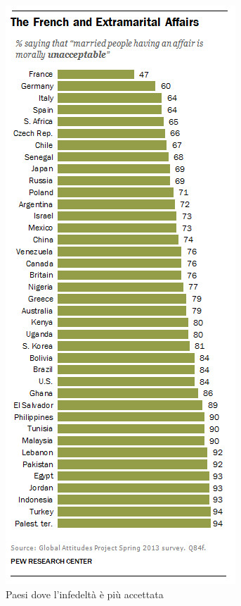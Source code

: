 \documentclass[12pt]{book} %
\begin{document}
\begin{figure}
  \centering
  \includegraphics[width=0.95\linewidth]{images/Libro-img016.jpg}
  \begin{minipage}{\linewidth}
    \caption{Paesi dove l'infedeltà è più accettata}
  \end{minipage}
\end{figure}
\end{document}
